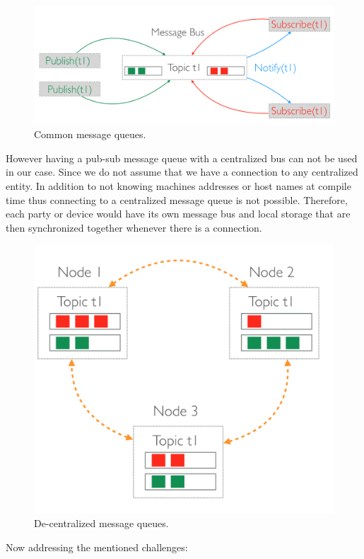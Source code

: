\begin{figure}[H]
	\centering
	\includegraphics[scale=0.3]{images/message-queues.png}
	\caption{Common message queues.}
	\label{fig:message-queues}
\end{figure}

\noindent However having a pub-sub message queue with a centralized bus can not be used in our case. Since we do not assume that we have a connection to any centralized entity. In addition to not knowing machines addresses or host names at compile time thus connecting to a centralized message queue is not possible. Therefore, each party or device would have its own message bus and local storage that are then synchronized together whenever there is a connection.

\begin{figure}[H]
	\centering
	\includegraphics[scale=0.3]{images/de-message-queues.png}
	\caption{De-centralized message queues.}
	\label{fig:de-message-queues}
\end{figure}
 Now addressing the mentioned challenges:

